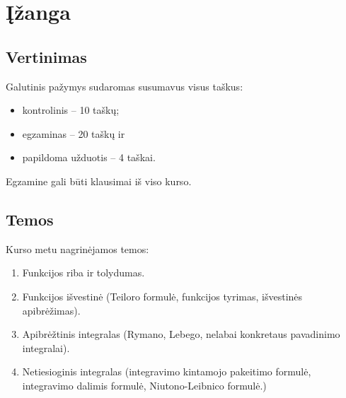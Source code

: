 \chapter{Įžanga}

\section{Vertinimas}

Galutinis pažymys sudaromas susumavus visus taškus:
\begin{itemize}
  \item kontrolinis – 10 taškų;
  \item egzaminas – 20 taškų ir
  \item papildoma užduotis – 4 taškai.
\end{itemize}

\begin{note}
  Egzamine gali būti klausimai iš viso kurso.
\end{note}

\section{Temos}

Kurso metu nagrinėjamos temos:
\begin{enumerate}
  \item Funkcijos riba ir tolydumas.
  \item Funkcijos išvestinė (Teiloro formulė, funkcijos tyrimas, 
    išvestinės apibrėžimas).
  \item Apibrėžtinis integralas (Rymano, Lebego, nelabai konkretaus
    pavadinimo integralai).
  \item Netiesioginis integralas (integravimo kintamojo pakeitimo formulė,
    integravimo dalimis formulė, Niutono-Leibnico formulė.)
\end{enumerate}
